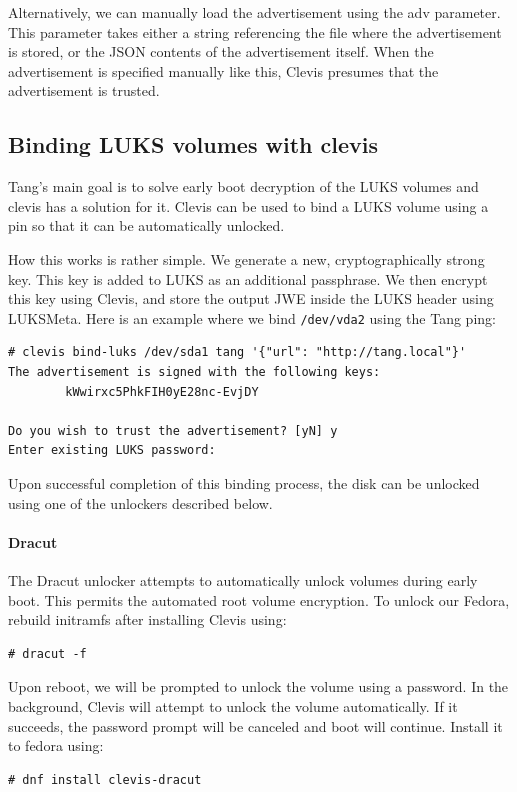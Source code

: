 Alternatively, we can manually load the advertisement using the adv parameter.
This parameter takes either a string referencing the file where the advertisement is stored, or the JSON contents of the advertisement itself.
When the advertisement is specified manually like this, Clevis presumes that the advertisement is trusted.



\subsection{Binding LUKS volumes with clevis}\label{dracut}
Tang's main goal is to solve early boot decryption of the LUKS volumes and clevis has a solution for it.
Clevis can be used to bind a LUKS volume using a pin so that it can be automatically unlocked.

How this works is rather simple. We generate a new, cryptographically strong key.
This key is added to LUKS as an additional passphrase.
We then encrypt this key using Clevis, and store the output JWE inside the LUKS header using LUKSMeta.
Here is an example where we bind {\tt /dev/vda2} using the Tang ping:
\begin{lstlisting}[columns=fixed,basicstyle=\ttfamily\footnotesize,tabsize=4,backgroundcolor=\color{yellow!10}]
# clevis bind-luks /dev/sda1 tang '{"url": "http://tang.local"}'
The advertisement is signed with the following keys:
        kWwirxc5PhkFIH0yE28nc-EvjDY

Do you wish to trust the advertisement? [yN] y
Enter existing LUKS password:
\end{lstlisting}

Upon successful completion of this binding process, the disk can be unlocked using one of the unlockers described below.


\paragraph{Dracut}\label{dracut}
The Dracut unlocker attempts to automatically unlock volumes during early boot.
This permits the automated root volume encryption.
To unlock our Fedora, rebuild initramfs after installing Clevis using: %

\begin{lstlisting}[columns=fixed,basicstyle=\ttfamily\footnotesize,tabsize=4,backgroundcolor=\color{yellow!10}]
# dracut -f
\end{lstlisting}
Upon reboot, we will be prompted to unlock the volume using a password.
In the background, Clevis will attempt to unlock the volume automatically.
If it succeeds, the password prompt will be canceled and boot will continue.
Install it to fedora using:
\begin{lstlisting}[columns=fixed,basicstyle=\ttfamily\footnotesize,tabsize=4,backgroundcolor=\color{yellow!10}]
# dnf install clevis-dracut
\end{lstlisting}
